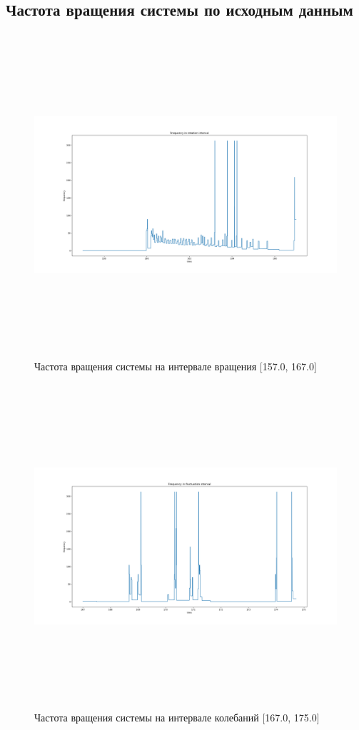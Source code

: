 \documentclass[a4paper,12pt]{article} %
\begin{document}
	\subsection{Частота вращения системы по исходным данным}
	\begin{figure}[H]
		\centering
		\includegraphics[width = 18cm, height = 12cm]{Rot_origin.png}
		\caption{Частота вращения системы на интервале вращения [157.0, 167.0]}
		\label{fig:rot_origin}
	\end{figure}
	\begin{figure}[H]
		
		\includegraphics[width = 18cm, height = 12cm]{Fluct_origin.png}
		\caption{Частота вращения системы на интервале колебаний [167.0, 175.0]}
		\label{fig:fluct_origin}
	\end{figure}
\end{document}
